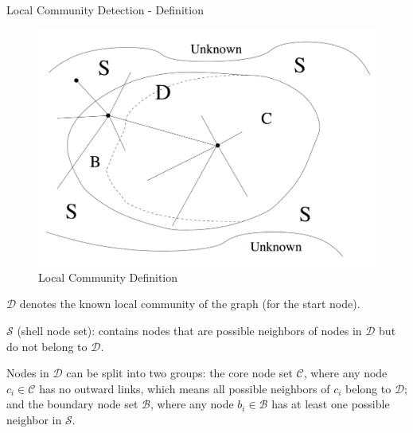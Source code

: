 \documentclass[9pt]{beamer}
\begin{document}
\begin{frame}{Local Community Detection - Definition}

\begin{figure}
\centering
\includegraphics[scale = 0.1]{localCommunityDefinition.jpeg}
\caption{Local Community Definition}
\label{Local_Community_Definition}
\end{figure}
\small %

$\mathcal{D}$ denotes the known local community of the graph (for the start node). 

$\mathcal{S}$ (shell node set): contains nodes that are possible neighbors of nodes in $\mathcal{D}$ but do not belong to $\mathcal{D}$. 

Nodes in $\mathcal{D}$ can be split into two groups: the core node set $\mathcal{C}$, where any node $c_i\in \mathcal{C}$ has no outward links, which means all possible neighbors of $c_i$ belong to $\mathcal{D}$; and the boundary node set $\mathcal{B}$, where any node $b_i\in \mathcal{B}$ has at least one possible neighbor in $\mathcal{S}$.
\end{frame}

    
\end{document}
